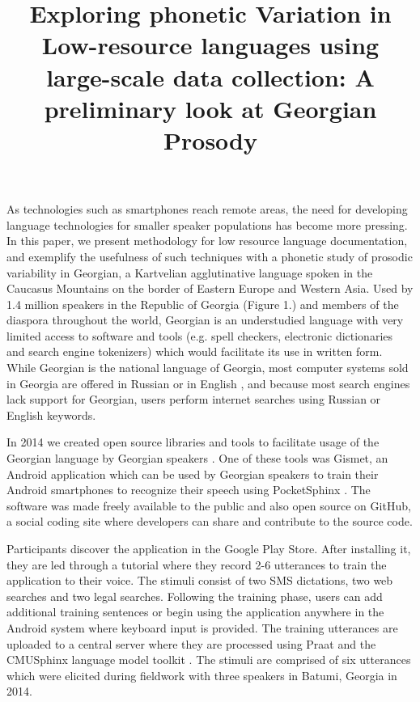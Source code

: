 \documentclass[12pt]{amsart}
\begin{document}
\title{ E\MakeLowercase{xploring} p\MakeLowercase{honetic} V\MakeLowercase{ariation} \MakeLowercase{in} L\MakeLowercase{ow}-r\MakeLowercase{esource} l\MakeLowercase{anguages} u\MakeLowercase{sing} l\MakeLowercase{arge}-s\MakeLowercase{cale} d\MakeLowercase{ata} c\MakeLowercase{ollection}: A p\MakeLowercase{reliminary} l\MakeLowercase{ook} \MakeLowercase{at} G\MakeLowercase{eorgian} P\MakeLowercase{rosody} }
\maketitle

\vspace{-0.05in}

As technologies such as smartphones reach remote areas, the need for
developing language technologies for smaller speaker populations has
become more pressing. In this paper, we present methodology for low resource
language documentation, and exemplify the usefulness of such techniques with a
phonetic study of prosodic variability in Georgian, a Kartvelian agglutinative
language spoken in the Caucasus Mountains on the border of Eastern Europe and
Western Asia. Used by 1.4 million speakers in the Republic of Georgia (Figure
1.) and members of the diaspora throughout the world, Georgian is an
understudied language with very limited access to software and tools (e.g. spell
checkers, electronic dictionaries and search engine tokenizers) which would
facilitate its use in written form. While Georgian is the national language of
Georgia, most computer systems sold in Georgia are offered in Russian or in
English \cite{Sh}, and because most search engines lack support for Georgian,
users perform internet searches using Russian or English keywords.

In 2014 we created open source libraries and tools to facilitate usage of the
Georgian language by Georgian speakers \cite{Du}. One of these tools was Gismet,
an Android application which can be used by Georgian speakers to train their
Android smartphones to recognize their speech using PocketSphinx \cite{Hu}. The
software was made freely available to the public and also open source on GitHub,
a social coding site where developers can share and contribute to the source
code.

Participants discover the application in the Google Play Store. After installing
it, they are led through a tutorial where they record 2-6 utterances to train
the application to their voice. The stimuli consist of two SMS dictations, two
web searches and two legal searches. Following the training phase, users can add
additional training sentences or begin using the application anywhere in the
Android system where keyboard input is provided. The training utterances are
uploaded to a central server where they are processed using Praat \cite{Bo} and
the CMUSphinx language model toolkit \cite{Wa}. The stimuli are comprised of six
utterances which were elicited during fieldwork with three speakers in Batumi,
Georgia in 2014.
\end{document}
